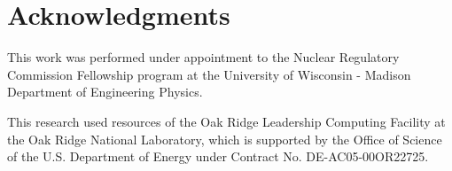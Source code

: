 \documentclass{snamc2013}
\begin{document}
\section*{Acknowledgments}

This work was performed under appointment to the Nuclear Regulatory
Commission Fellowship program at the University of Wisconsin - Madison
Department of Engineering Physics.

This research used resources of the Oak Ridge Leadership Computing
Facility at the Oak Ridge National Laboratory, which is supported by
the Office of Science of the U.S. Department of Energy under Contract
No. DE-AC05-00OR22725.



\end{document}
